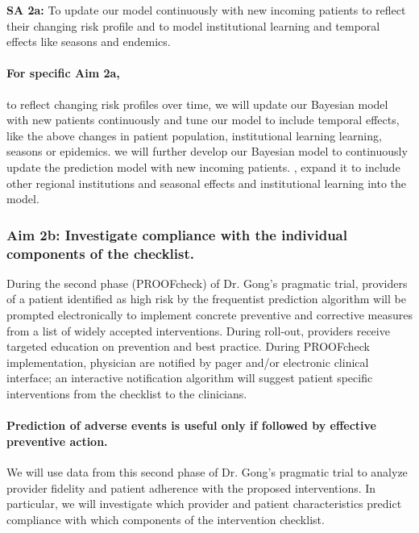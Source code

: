 \documentclass[11pt,notitlepage]{article}
\begin{document}
\textbf{SA 2a:} To update our model continuously with new incoming patients to reflect their changing risk profile and to model institutional learning and temporal effects like seasons and endemics. 

\paragraph*{For specific Aim 2a,} to reflect changing risk profiles over time, we will update our Bayesian model with new patients continuously and tune our model to include temporal effects, like the above changes in patient population, institutional learning learning, seasons or epidemics. we will further develop our Bayesian model to continuously update the prediction model with new incoming patients. , expand it to include other regional institutions and seasonal effects and institutional learning into the model.


\subsubsection*{Aim 2b: Investigate compliance with the individual components of the checklist.}
During the second phase (PROOFcheck) of Dr. Gong's pragmatic trial, providers of a patient identified as high risk by the frequentist prediction algorithm will be prompted electronically to implement concrete preventive and corrective measures from a list of widely accepted interventions. During roll-out, providers receive targeted education on prevention and best practice. During PROOFcheck implementation, physician are notified by pager and/or electronic clinical interface; an interactive notification algorithm will suggest patient specific interventions from the checklist to the clinicians.  

\paragraph*{Prediction of adverse events is useful only if followed by effective preventive action. } We will use data from this second phase of Dr. Gong's pragmatic trial to analyze provider fidelity and patient adherence with the proposed interventions. In particular, we will investigate which provider and patient characteristics predict compliance with which components of the intervention checklist. 
\end{document}
